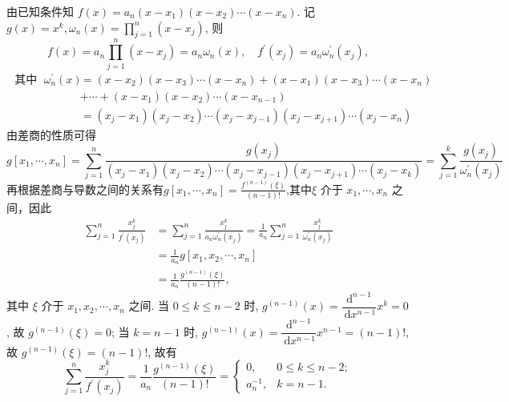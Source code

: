 \begin{tcolorbox}
 由已知条件知 $ f(x)=a_{n}\left(x-x_{1}\right)\left(x-x_{2}\right) \cdots\left(x-x_{n}\right) $.
记 $ g(x)=x^{k}, \omega_{n}(x)=\prod\limits_{j=1}^{n}\left(x-x_{j}\right) $, 则
$$
f(x)=a_n \prod\limits_{j=1}^{n}\left(x-x_{j}\right)=a_{n} \omega_{n}(x), \quad f^{\prime}\left(x_{j}\right)=a_{n} \omega_{n}^{\prime}\left(x_{j}\right),
$$
$$\begin{aligned}
\text { 其中 }\; \omega_{n}^{\prime}(x)&=  \left(x-x_{2}\right)\left(x-x_{3}\right) \cdots\left(x-x_{n}\right)+\left(x-x_{1}\right)\left(x-x_{3}\right) \cdots\left(x-x_{n}\right) \\
& +\cdots+\left(x-x_{1}\right)\left(x-x_{2}\right) \cdots\left(x-x_{n-1}\right)\\
&=\left(x_{j}-x_{1}\right)\left(x_{j}-x_{2}\right) \cdots\left(x_{j}-x_{j-1}\right)\left(x_{j}-x_{j+1}\right) \cdots\left(x_{j}-x_{n}\right) 
\end{aligned} $$
由差商的性质可得 $$ g\left[x_{1}, \cdots, x_{n}\right]=\sum\limits_{j=1}^{n}\frac{g(x_j)}{\left(x_{j}-x_{1}\right)\left(x_{j}-x_{2}\right) \cdots\left(x_{j}-x_{j-1}\right)\left(x_{j}-x_{j+1}\right) \cdots\left(x_{j}-x_{k}\right) }=\sum\limits_{j=1}^{k} \frac{g\left(x_{j}\right)}{\omega_{n}^{\prime}\left(x_{j}\right)}  $$
再根据差商与导数之间的关系有$ g\left[x_{1}, \cdots, x_{n}\right]=\frac{f^{(n-1)}(\xi)}{(n-1) !}$,其中$ \xi $ 介于 $ x_{1}, \cdots, x_{n} $ 之间，因此
$$
\begin{aligned}
\sum_{j=1}^{n} \frac{x_{j}^{k}}{f^{\prime}\left(x_{j}\right)} & =\sum_{j=1}^{n} \frac{x_{j}^{k}}{a_{n} \omega_{n}^{\prime}\left(x_{j}\right)}=\frac{1}{a_{n}} \sum_{j=1}^{n} \frac{x_{j}^{k}}{\omega_{n}^{\prime}\left(x_{j}\right)} \\
& =\frac{1}{a_{n}} g\left[x_{1}, x_{2}, \cdots, x_{n}\right] \\
& =\frac{1}{a_{n}} \frac{g^{(n-1)}(\xi)}{(n-1) !},
\end{aligned}
$$
其中 $ \xi $ 介于 $ x_{1}, x_{2}, \cdots, x_{n} $ 之间.
当 $ 0 \leqslant k \leqslant n-2 $ 时, $ g^{(n-1)}(x)=\dfrac{\mathrm{d}^{n-1}}{\mathrm{~d} x^{n-1}} x^{k}=0 $, 故 $ g^{(n-1)}(\xi)=0 $;
当 $ k=n-1 $ 时, $ g^{(n-1)}(x)=\dfrac{\mathrm{d}^{n-1}}{\mathrm{~d} x^{n-1}} x^{n-1}=(n-1) ! $, 故 $ g^{(n-1)}(\xi)=(n-1) ! $, 故有
$$
\sum_{j=1}^{n} \frac{x_{j}^{k}}{f^{\prime}\left(x_{j}\right)}=\frac{1}{a_{n}} \frac{g^{(n-1)}(\xi)}{(n-1) !}=\left\{\begin{array}{ll}
0, & 0 \leqslant k \leqslant n-2 ; \\
a_{n}^{-1}, & k=n-1 .
\end{array}\right.
$$

\end{tcolorbox}

